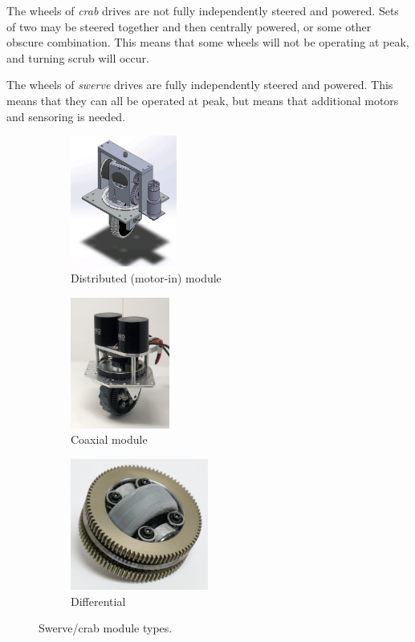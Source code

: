 \documentclass[10pt,letterpaper]{book}
\begin{document}
\begin{asparaenum}[a)]
	\item The wheels of \textit{crab} drives are not fully independently steered and powered. Sets of two may be steered together and then centrally powered, or some other obscure combination. This means that some wheels will not be operating at peak, and turning scrub will occur.
	\item The wheels of \textit{swerve} drives are fully independently steered and powered. This means that they can all be operated at peak, but means that additional motors and sensoring is needed.
\end{asparaenum}

\begin{figure}[H]

\begin{subfigure}[b]{.32\linewidth}
	\includegraphics[height=1.7in]{imgs/drivetrain_swerve_dist.jpeg}
	\caption{Distributed (motor-in) module}
\end{subfigure}\begin{subfigure}[b]{.32\linewidth}
	\includegraphics[height=1.7in]{imgs/drivetrain_swerve_coax.jpeg}
	\caption{Coaxial module}
\end{subfigure}\begin{subfigure}[b]{.32\linewidth}
	\includegraphics[height=1.7in]{imgs/drivetrain_swerve_diff.png}
	\caption{Differential}
\end{subfigure}
\caption{Swerve/crab module types.}
\end{figure}
\end{document}
